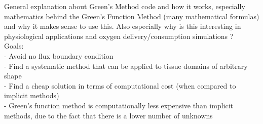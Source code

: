 General explanation about Green's Method code and how it works, especially mathematics behind the Green's Function Method (many mathematical formulas) and why it makes sense to use this. Also especially why is this interesting in physiological applications and oxygen delivery/consumption simulations ?
\\Goals:
\\- Avoid no flux boundary condition
\\- Find a systematic method that can be applied to tissue domains of arbitrary shape
\\- Find a cheap solution in terms of computational cost (when compared to implicit methods)
\\- Green's function method is computationally less expensive than implicit methods, due to the fact that there is a lower number of unknowns


